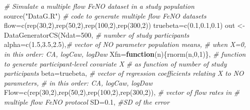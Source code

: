 \documentclass[
]{article}
\newenvironment{Shaded}{\begin{snugshade}}{\end{snugshade}}
\newcommand{\AttributeTok}[1]{\textcolor[rgb]{0.77,0.63,0.00}{#1}}
\newcommand{\CommentTok}[1]{\textcolor[rgb]{0.56,0.35,0.01}{\textit{#1}}}
\newcommand{\ControlFlowTok}[1]{\textcolor[rgb]{0.13,0.29,0.53}{\textbf{#1}}}
\newcommand{\DecValTok}[1]{\textcolor[rgb]{0.00,0.00,0.81}{#1}}
\newcommand{\FloatTok}[1]{\textcolor[rgb]{0.00,0.00,0.81}{#1}}
\newcommand{\FunctionTok}[1]{\textcolor[rgb]{0.00,0.00,0.00}{#1}}
\newcommand{\NormalTok}[1]{#1}
\newcommand{\OtherTok}[1]{\textcolor[rgb]{0.56,0.35,0.01}{#1}}
\newcommand{\StringTok}[1]{\textcolor[rgb]{0.31,0.60,0.02}{#1}}
\begin{document}
\begin{Shaded}
\begin{Highlighting}[]
\CommentTok{\# Simulate a multiple flow FeNO dataset in a study population}
\FunctionTok{source}\NormalTok{(}\StringTok{"DataG.R"}\NormalTok{)       }\CommentTok{\# code to generate multiple flow FeNO datasets}
\NormalTok{flow}\OtherTok{=}\FunctionTok{c}\NormalTok{(}\FunctionTok{rep}\NormalTok{(}\DecValTok{30}\NormalTok{,}\DecValTok{2}\NormalTok{),}\FunctionTok{rep}\NormalTok{(}\DecValTok{50}\NormalTok{,}\DecValTok{2}\NormalTok{),}\FunctionTok{rep}\NormalTok{(}\DecValTok{100}\NormalTok{,}\DecValTok{2}\NormalTok{),}\FunctionTok{rep}\NormalTok{(}\DecValTok{300}\NormalTok{,}\DecValTok{2}\NormalTok{))}
\NormalTok{truebeta}\OtherTok{=}\FunctionTok{c}\NormalTok{(}\FloatTok{0.1}\NormalTok{,}\FloatTok{0.1}\NormalTok{,}\FloatTok{0.1}\NormalTok{)}
\NormalTok{out }\OtherTok{\textless{}{-}} \FunctionTok{DataGeneratorCS}\NormalTok{(}\AttributeTok{Ndat=}\DecValTok{500}\NormalTok{,           }\CommentTok{\# number of study participants}
                      \AttributeTok{alpha=}\FunctionTok{c}\NormalTok{(}\FloatTok{1.5}\NormalTok{,}\FloatTok{3.5}\NormalTok{,}\FloatTok{2.5}\NormalTok{),}\CommentTok{\# vector of NO parameter population means, }
                                           \CommentTok{\# when X=0, in this order: CA, logCaw, logDaw}
                      \AttributeTok{Xfn=}\ControlFlowTok{function}\NormalTok{(n)\{}\FunctionTok{rnorm}\NormalTok{(n,}\DecValTok{0}\NormalTok{,}\DecValTok{1}\NormalTok{)\}, }\CommentTok{\# function to generate participant{-}level covariate X }
                                                     \CommentTok{\# as function of number of study participants}
                      \AttributeTok{beta=}\NormalTok{truebeta, }\CommentTok{\# vector of regression coefficients relating X to NO parameters, }
                                           \CommentTok{\# in this order: CA, logCaw, logDaw}
                      \AttributeTok{Flow=}\FunctionTok{c}\NormalTok{(}\FunctionTok{rep}\NormalTok{(}\DecValTok{30}\NormalTok{,}\DecValTok{2}\NormalTok{),}\FunctionTok{rep}\NormalTok{(}\DecValTok{50}\NormalTok{,}\DecValTok{2}\NormalTok{),}\FunctionTok{rep}\NormalTok{(}\DecValTok{100}\NormalTok{,}\DecValTok{2}\NormalTok{),}\FunctionTok{rep}\NormalTok{(}\DecValTok{300}\NormalTok{,}\DecValTok{2}\NormalTok{)), }\CommentTok{\# vector of flow rates in }
                                                                         \CommentTok{\# multiple flow FeNO protocol}
                      \AttributeTok{SD=}\FloatTok{0.1}\NormalTok{,              }\CommentTok{\#SD of the error}

\end{Highlighting}
\end{Shaded}
\end{document}
